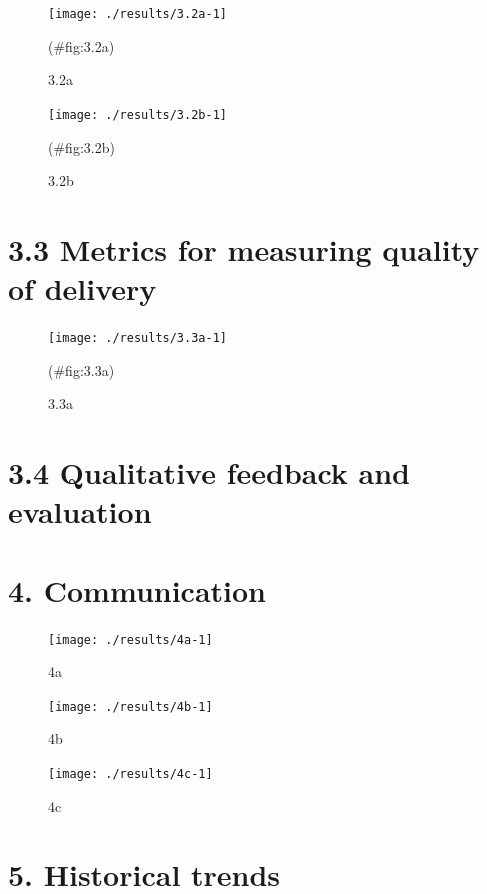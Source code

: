 \documentclass[
]{article}
\begin{document}
\begin{figure}[H]

{\centering \texttt{[image: ./results/3.2a-1]} 

}

\caption{3.2a}(\#fig:3.2a)
\end{figure}

\begin{figure}[H]

{\centering \texttt{[image: ./results/3.2b-1]} 

}

\caption{3.2b}(\#fig:3.2b)
\end{figure}

\hypertarget{metrics-for-measuring-quality-of-delivery}{%
\section{3.3 Metrics for measuring quality of delivery}\label{metrics-for-measuring-quality-of-delivery}}

\begin{figure}[H]

{\centering \texttt{[image: ./results/3.3a-1]} 

}

\caption{3.3a}(\#fig:3.3a)
\end{figure}

\hypertarget{qualitative-feedback-and-evaluation}{%
\section{3.4 Qualitative feedback and evaluation}\label{qualitative-feedback-and-evaluation}}

\hypertarget{communication}{%
\section{4. Communication}\label{communication}}

\begin{figure}[H]

{\centering \texttt{[image: ./results/4a-1]} 

}

\caption{4a}\label{fig:4a}
\end{figure}

\begin{figure}[H]

{\centering \texttt{[image: ./results/4b-1]} 

}

\caption{4b}\label{fig:4b}
\end{figure}

\begin{figure}[H]

{\centering \texttt{[image: ./results/4c-1]} 

}

\caption{4c}\label{fig:4c}
\end{figure}

\hypertarget{historical-trends}{%
\section{5. Historical trends}\label{historical-trends}}
\end{document}
